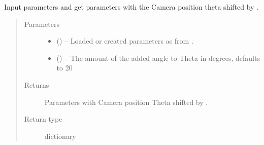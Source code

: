 \documentclass[letterpaper,10pt,english]{sphinxmanual}
\begin{document}
\begin{fulllineitems}
\begin{fulllineitems}
\end{fulllineitems}


\begin{fulllineitems}
\label{\detokenize{index:dataset.dataset_cuboids.change_apperence_camera_theta_relative}}
Input parameters and get parameters with the Camera position theta shifted by .
\begin{quote}\begin{description}
\item[{Parameters}] \leavevmode\begin{itemize}
\item {} 
 () -- Loaded or created parameters as from {\hyperref[\detokenize{index:dataset.dataset_cuboids.create_random_parameters}]{}}.

\item {} 
 (\sphinxstyleliteralemphasis{\sphinxupquote{, }}) -- The amount of the added angle to Theta in degrees, defaults to 20

\end{itemize}

\item[{Returns}] \leavevmode
Parameters with Camera position Theta shifted by .

\item[{Return type}] \leavevmode
dictionary

\end{description}\end{quote}

\end{fulllineitems}



\end{fulllineitems}
\end{document}
